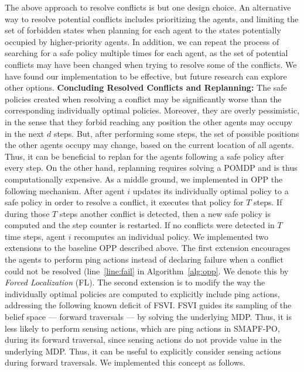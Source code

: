 \documentclass[letterpaper]{article} %
\begin{document}
The above approach to resolve conflicts is but one design choice.
An alternative way to resolve potential conflicts includes prioritizing the agents, and limiting the set of forbidden states when planning for each agent to the states potentially occupied by higher-priority agents. In addition, we can repeat the process of searching for a safe policy multiple times for each agent, as the set of potential conflicts may have been changed when trying to resolve some of the conflicts. We have found our implementation to be effective, but future research can explore other options.
\noindent\textbf{Concluding Resolved Conflicts and Replanning:}
The safe policies created when resolving a conflict may be significantly worse than the corresponding individually optimal policies. Moreover, they are overly pessimistic, in the sense that they forbid reaching any position the other agents may occupy in the next $d$ steps. But, after performing some steps, the set of possible positions the other agents occupy may change, based on the current location of all agents. Thus, it can be beneficial to replan for the agents following a safe policy after every step. On the other hand, replanning requires solving a POMDP and is thus computationally expensive.
 As a middle ground, we implemented in OPP the following mechanism. After agent $i$ updates its individually optimal policy to a safe policy in order to resolve a conflict, it executes that policy for $T$ steps. If during those $T$ steps another conflict is detected, then a new safe policy is computed and the step counter is restarted. If no conflicts were detected in $T$ time steps, agent $i$ recomputes an individual  policy.
We implemented two extensions to the baseline OPP described above.
The first extension encourages the agents to perform ping actions instead of declaring failure when a conflict could not be resolved (line~\ref{line:fail} in Algorithm~\ref{alg:opp}. We denote this by \emph{Forced Localization} (FL).
The second extension is to modify the way the individually optimal policies are computed to explicitly include ping actions, addressing the following known deficit of FSVI.
FSVI guides its sampling of the belief space --- forward traversals --- by solving the underlying MDP.
Thus, it is less likely to perform sensing actions, which are ping actions in SMAPF-PO, during its forward traversal, since sensing actions do not provide value in the underlying MDP.
Thus, it can be useful to explicitly consider sensing actions during forward traversals.
We implemented this concept as follows.
\end{document}
